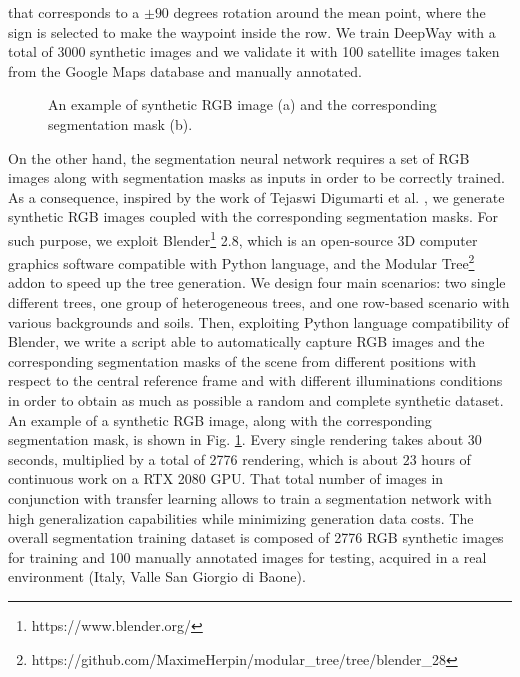 \documentclass[journal]{IEEEtran}
\begin{document}
that corresponds to a $\pm 90$ degrees rotation around the mean point, where the sign is selected to make the waypoint inside the row. We train DeepWay with a total of 3000 synthetic images and we validate it with 100 satellite images taken from the Google Maps database and manually annotated.
\begin{figure}[!ht]
\centering
{}
\hfil
{}
\caption{An example of synthetic RGB image (a) and the corresponding segmentation mask (b).}
\label{fig:synthetic_dataset}
\end{figure}

On the other hand, the segmentation neural network requires a set of RGB images along with segmentation masks as inputs in order to be correctly trained. As a consequence, inspired by the work of Tejaswi Digumarti et al. \cite{semantic_seg_synthetic_images}, we generate synthetic RGB images coupled with the corresponding segmentation masks. For such purpose, we exploit Blender\footnote{https://www.blender.org/} 2.8, which is an open-source 3D computer graphics software compatible with Python language, and the Modular Tree\footnote{https://github.com/MaximeHerpin/modular\_tree/tree/blender\_28} addon to speed up the tree generation. We design four main scenarios: two single different trees, one group of heterogeneous trees, and one row-based scenario with various backgrounds and soils. Then, exploiting Python language compatibility of Blender, we write a script able to automatically capture RGB images and the corresponding segmentation masks of the scene from different positions with respect to the central reference frame and with different illuminations conditions in order to obtain as much as possible a random and complete synthetic dataset. An example of a synthetic RGB image, along with the corresponding segmentation mask, is shown in Fig. \ref{fig:synthetic_dataset}. Every single rendering takes about $30$ seconds, multiplied by a total of 2776 rendering, which is about $23$ hours of continuous work on a RTX 2080 GPU. That total number of images in conjunction with transfer learning allows to train a segmentation network with high generalization capabilities while minimizing generation data costs. The overall segmentation training dataset is composed of 2776 RGB synthetic images for training and 100 manually annotated images for testing, acquired in a real environment (Italy, Valle San Giorgio di Baone).
\vspace{-5pt}
\end{document}
